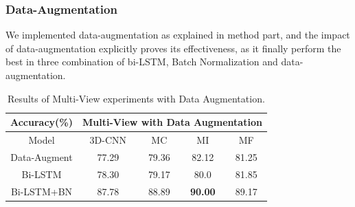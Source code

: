 \subsubsection{Data-Augmentation}
We implemented data-augmentation as explained in method part, and the impact of data-augmentation explicitly proves its effectiveness, as it finally perform the best in three combination of bi-LSTM, Batch Normalization and data-augmentation.
\begin{table}[h]
	\centering
	\begin{tabular}{c|cccc}
		\multicolumn{1}{c|}{Accuracy(\%)} &%
		\multicolumn{4}{c}{Multi-View with Data Augmentation}\\ \hline
		Model&%
		3D-CNN & MC & MI & MF \\\hline
		Data-Augment%
		& %
		77.29 & 79.36& 82.12& 81.25\\
		Bi-LSTM%
		& %
		78.30 & 79.17& 80.0& 81.85\\
		Bi-LSTM+BN%
		& %
		87.78& 88.89& \textbf{90.00}& 89.17\\
	\end{tabular}
	\caption{Results of Multi-View experiments with Data Augmentation.}
	\label{tab:multitbaug}
\end{table}



